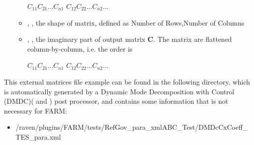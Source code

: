 \begin{itemize}
\begin{itemize}
    \begin{math} C_{11} C_{21} ... C_{n1} \end{math} \begin{math}C_{12} C_{22} ... C_{n2} ... \end{math}
    \item {}, , 
    the shape of matrix, defined as Number of Rows,Number of Columns
    \item {}, , 
    the imaginary part of output matrix \begin{math} \textbf{C} \end{math}. The matrix are flattened 
    column-by-column, i.e. the order is 

    \begin{math} C_{11} C_{21} ... C_{n1} \end{math} \begin{math}C_{12} C_{22} ... C_{n2} ... \end{math}
  \end{itemize}
    
\end{itemize}

This external matrices file example can be found in the following directory, which is automatically generated by a 
Dynamic Mode Decomposition with Control (DMDC)(\cite{proctor2016dynamic} and \cite{wang2020DMDc}) post processor, 
and contains some information that is not necessary for FARM:
\begin{itemize}
  \item /raven/plugins/FARM/tests/RefGov\_para\_xmlABC\_Test/DMDcCxCoeff\_TES\_para.xml
\end{itemize}

